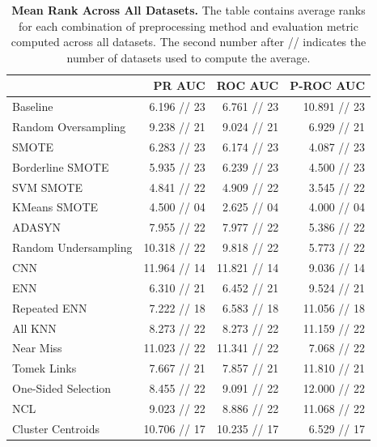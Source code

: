 \documentclass[conference]{IEEEtran}
\begin{document}
\begin{table}
    \centering
    \setlength\tabcolsep{2pt}

    \begin{tabularx}{\linewidth}{lRRR}
        & PR AUC & ROC AUC & P-ROC AUC \\
        \midrule
        Baseline & 6.196 // 23 & 6.761 // 23 & 10.891 // 23 \\
        Random Oversampling & 9.238 // 21 & 9.024 // 21 & 6.929 // 21 \\
        SMOTE & 6.283 // 23 & 6.174 // 23 & 4.087 // 23 \\
        Borderline SMOTE & 5.935 // 23 & 6.239 // 23 & 4.500 // 23 \\
        SVM SMOTE & 4.841 // 22 & 4.909 // 22 & 3.545 // 22 \\
        KMeans SMOTE & 4.500 // 04 & 2.625 // 04 & 4.000 // 04 \\
        ADASYN & 7.955 // 22 & 7.977 // 22 & 5.386 // 22 \\
        Random Undersampling & 10.318 // 22 & 9.818 // 22 & 5.773 // 22 \\
        CNN & 11.964 // 14 & 11.821 // 14 & 9.036 // 14 \\
        ENN & 6.310 // 21 & 6.452 // 21 & 9.524 // 21 \\
        Repeated ENN & 7.222 // 18 & 6.583 // 18 & 11.056 // 18 \\
        All KNN & 8.273 // 22 & 8.273 // 22 & 11.159 // 22 \\
        Near Miss & 11.023 // 22 & 11.341 // 22 & 7.068 // 22 \\
        Tomek Links & 7.667 // 21 & 7.857 // 21 & 11.810 // 21 \\
        One-Sided Selection & 8.455 // 22 & 9.091 // 22 & 12.000 // 22 \\
        NCL & 9.023 // 22 & 8.886 // 22 & 11.068 // 22 \\
        Cluster Centroids & 10.706 // 17 & 10.235 // 17 & 6.529 // 17 \\
    \end{tabularx}

    \vspace{4mm}

    \caption{
        \textbf{Mean Rank Across All Datasets.} The table contains average ranks for each
        combination of preprocessing method and evaluation metric computed across all datasets. The
        second number after // indicates the number of datasets used to compute the average.
    }
    \label{table:mean-rank}
\end{table}
\end{document}
